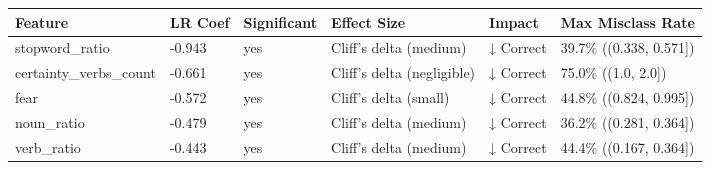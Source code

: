 \begin{tabular}{llllll}
\toprule
Feature & LR Coef & Significant & Effect Size & Impact & Max Misclass Rate \\
\midrule
stopword\_ratio & -0.943 & yes & Cliff's delta (medium) & ↓ Correct & 39.7\% ((0.338, 0.571]) \\
certainty\_verbs\_count & -0.661 & yes & Cliff's delta (negligible) & ↓ Correct & 75.0\% ((1.0, 2.0]) \\
fear & -0.572 & yes & Cliff's delta (small) & ↓ Correct & 44.8\% ((0.824, 0.995]) \\
noun\_ratio & -0.479 & yes & Cliff's delta (medium) & ↓ Correct & 36.2\% ((0.281, 0.364]) \\
verb\_ratio & -0.443 & yes & Cliff's delta (medium) & ↓ Correct & 44.4\% ((0.167, 0.364]) \\
\bottomrule
\end{tabular}
